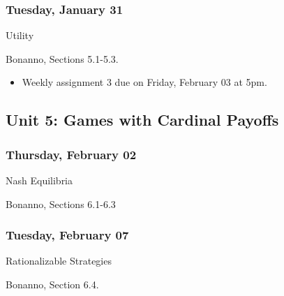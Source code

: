\documentclass[
]{article}
\providecommand{\tightlist}{%
  \setlength{\itemsep}{0pt}\setlength{\parskip}{0pt}}
\begin{document}
\hypertarget{tuesday-january-31}{%
\subsubsection{Tuesday, January 31}\label{tuesday-january-31}}

\begin{description}
\tightlist
\item[Topic]
Utility
\item[Reading]
Bonanno, Sections 5.1-5.3.
\end{description}

\begin{itemize}
\tightlist
\item
  Weekly assignment 3 due on Friday, February 03 at 5pm.
\end{itemize}

\hypertarget{unit-5-games-with-cardinal-payoffs}{%
\subsection{Unit 5: Games with Cardinal
Payoffs}\label{unit-5-games-with-cardinal-payoffs}}

\begin{multicols}{2}

\hypertarget{thursday-february-02}{%
\subsubsection{Thursday, February 02}\label{thursday-february-02}}

\begin{description}
\tightlist
\item[Topic]
Nash Equilibria
\item[Reading]
Bonanno, Sections 6.1-6.3
\end{description}

\hypertarget{tuesday-february-07}{%
\subsubsection{Tuesday, February 07}\label{tuesday-february-07}}

\begin{description}
\tightlist
\item[Topic]
Rationalizable Strategies
\item[Reading]
Bonanno, Section 6.4.
\end{description}

\end{multicols}
\end{document}
